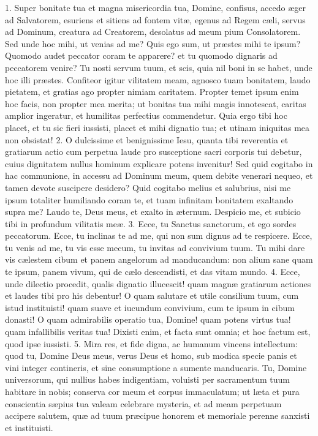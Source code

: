 1. Super bonitate tua et magna misericordia tua, Domine, confisus, accedo æger ad Salvatorem, esuriens et sitiens ad fontem vitæ, egenus ad Regem cæli, servus ad Dominum, creatura ad Creatorem, desolatus ad meum pium Consolatorem. Sed unde hoc mihi, ut venias ad me? Quis ego sum, ut præstes mihi te ipsum? Quomodo audet peccator coram te apparere? et tu quomodo dignaris ad peccatorem venire? Tu nosti servum tuum, et scis, quia nil boni in se habet, unde hoc illi præstes. Confiteor igitur vilitatem meam, agnosco tuam bonitatem, laudo pietatem, et gratias ago propter nimiam caritatem. Propter temet ipsum enim hoc facis, non propter mea merita; ut bonitas tua mihi magis innotescat, caritas amplior ingeratur, et humilitas perfectius commendetur. Quia ergo tibi hoc placet, et tu sic fieri iussisti, placet et mihi dignatio tua; et utinam iniquitas mea non obsistat!
2. O dulcissime et benignissime Iesu, quanta tibi reverentia et gratiarum actio cum perpetua laude pro susceptione sacri corporis tui debetur, cuius dignitatem nullus hominum explicare potens invenitur! Sed quid cogitabo in hac communione, in accessu ad Dominum meum, quem debite venerari nequeo, et tamen devote suscipere desidero? Quid cogitabo melius et salubrius, nisi me ipsum totaliter humiliando coram te, et tuam infinitam bonitatem exaltando supra me? Laudo te, Deus meus, et exalto in æternum. Despicio me, et subicio tibi in profundum vilitatis meæ.
3. Ecce, tu Sanctus sanctorum, et ego sordes peccatorum. Ecce, tu inclinas te ad me, qui non sum dignus ad te respicere. Ecce, tu venis ad me, tu vis esse mecum, tu invitas ad convivium tuum. Tu mihi dare vis cælestem cibum et panem angelorum ad manducandum: non alium sane quam te ipsum, panem vivum, qui de cælo descendisti, et das vitam mundo.
4. Ecce, unde dilectio procedit, qualis dignatio illucescit! quam magnæ gratiarum actiones et laudes tibi pro his debentur! O quam salutare et utile consilium tuum, cum istud instituisti! quam suave et iucundum convivium, cum te ipsum in cibum donasti! O quam admirabilis operatio tua, Domine! quam potens virtus tua! quam infallibilis veritas tua! Dixisti enim, et facta sunt omnia; et hoc factum est, quod ipse iussisti.
5. Mira res, et fide digna, ac humanum vincens intellectum: quod tu, Domine Deus meus, verus Deus et homo, sub modica specie panis et vini integer contineris, et sine consumptione a sumente manducaris. Tu, Domine universorum, qui nullius habes indigentiam, voluisti per sacramentum tuum habitare in nobis; conserva cor meum et corpus immaculatum; ut læta et pura conscientia sæpius tua valeam celebrare mysteria, et ad meam perpetuam accipere salutem, quæ ad tuum præcipue honorem et memoriale perenne sanxisti et instituisti.
